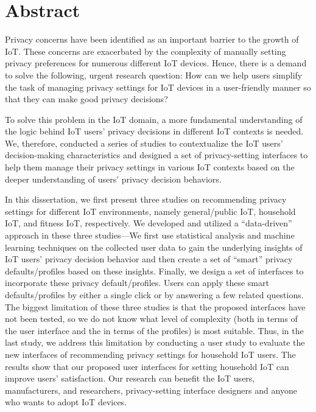 \chapter*{Abstract}
Privacy concerns have been identified as an important barrier to the growth of IoT. These concerns are exacerbated by the complexity of manually setting privacy preferences for numerous different IoT devices. Hence, there is a demand to solve the following, urgent research question: How can we help users simplify the task of managing privacy settings for IoT devices in a user-friendly manner so that they can make good privacy decisions?

To solve this problem in the IoT domain, a more fundamental understanding of the logic behind IoT users' privacy decisions in different IoT contexts is needed. We, therefore, conducted a series of studies to contextualize the IoT users' decision-making characteristics and designed a set of privacy-setting interfaces to help them manage their privacy settings in various IoT contexts based on the deeper understanding of users' privacy decision behaviors. 

In this dissertation, we first present three studies on recommending privacy settings for different IoT environments, namely general/public IoT, household IoT, and fitness IoT, respectively. We developed and utilized a ``data-driven” approach in these three studies—We first use statistical analysis and machine learning techniques on the collected user data to gain the underlying insights of IoT users' privacy decision behavior and then create a set of ``smart” privacy defaults/profiles based on these insights. Finally, we design a set of interfaces to incorporate these privacy default/profiles. Users can apply these smart defaults/profiles by either a single click or by answering a few related questions. The biggest limitation of these three studies is that the proposed interfaces have not been tested, so we do not know what level of complexity (both in terms of the user interface and the in terms of the profiles) is most suitable. Thus, in the last study, we address this limitation by conducting a user study to evaluate the new interfaces of recommending privacy settings for household IoT users. The results show that our proposed user interfaces for setting household IoT can improve users' satisfaction. Our research can benefit the IoT users, manufacturers, and researchers, privacy-setting interface designers and anyone who wants to adopt IoT devices.

